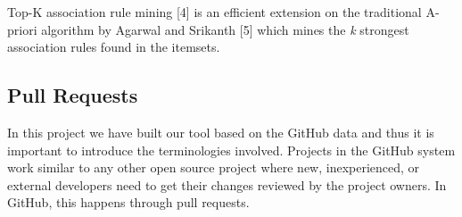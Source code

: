 \begin{table}[htbp]
  \centering
  \caption{A sample snapshot of check-ins in a repository.}
  \hspace{1cm}
  \label{table:checkins_snapshot}
\end{table}


Top-K association rule mining [4] is an efficient extension on the traditional A-priori algorithm by Agarwal and Srikanth [5] which mines the \textit{k} strongest association rules found in the itemsets.


\subsection{Pull Requests}


In this project we have built our tool based on the GitHub data and thus it is important to introduce the terminologies involved. Projects in the GitHub system work similar to any other open source project where new, inexperienced, or external developers need to get their changes reviewed by the project owners. In GitHub, this happens through pull requests.\\

